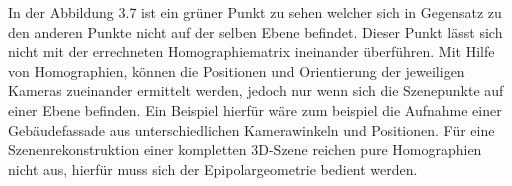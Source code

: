 In der Abbildung 3.7 ist ein grüner Punkt zu sehen welcher sich in Gegensatz zu den anderen Punkte nicht auf der selben Ebene befindet. Dieser Punkt lässt sich nicht mit der errechneten Homographiematrix ineinander überführen. Mit Hilfe von Homographien, können die Positionen und Orientierung der jeweiligen Kameras zueinander ermittelt werden, jedoch nur wenn sich die Szenepunkte auf einer Ebene befinden. Ein Beispiel hierfür wäre zum beispiel die Aufnahme einer Gebäudefassade aus unterschiedlichen Kamerawinkeln und Positionen\cite{Elements}. Für eine Szenenrekonstruktion einer kompletten 3D-Szene reichen pure Homographien nicht aus, hierfür muss sich der Epipolargeometrie bedient werden. 



%
%
%
%
%
%
%
%


